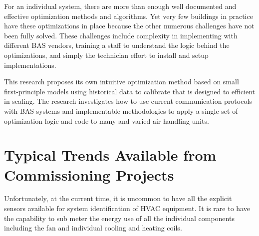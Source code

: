 For an individual system, there are more than enough well documented and effective optimization methods and algorithms. Yet very few buildings in practice have these optimizations in place because the other numerous challenges have not been fully solved. These challenges include complexity in implementing with different BAS vendors, training a staff to understand the logic behind the optimizations, and simply the technician effort to install and setup implementations.

This research proposes its own intuitive optimization method based on small first-principle models using historical data to calibrate that is designed to efficient in scaling. The research investigates how to use current communication protocols with BAS systems and implementable methodologies to apply a single set of optimization logic and code to many and varied air handling units. 

\section{Typical Trends Available from Commissioning Projects}

Unfortunately, at the current time, it is uncommon to have all the explicit sensors available for system identification of HVAC equipment. It is rare to have the capability to sub meter the energy use of all the individual components including the fan and individual cooling and heating coils. 








